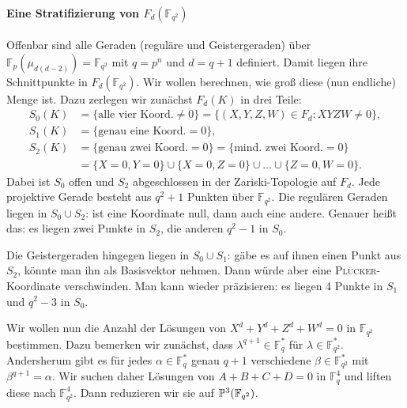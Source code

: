 \paragraph{Eine Stratifizierung von $F_d(\mathbb F_{q^2})$} Offenbar sind alle Geraden (reguläre und Geistergeraden) über $\mathbb F_p(\mu_{d(d-2)}) = \mathbb F_{q^2}$ mit $q = p^n$ und $d = q+1$ definiert. Damit liegen ihre Schnittpunkte in $F_d(\mathbb F_{q^2})$. Wir wollen berechnen, wie groß diese (nun endliche) Menge ist. Dazu zerlegen wir zunächst $F_d(K)$ in drei Teile:
\begin{align*}
S_0(K) &= \{\text{alle vier Koord.}\neq 0\} = \{(X,Y,Z,W) \in F_d : XYZW \neq 0\}, \\
S_1(K) &= \{\text{genau eine Koord.}= 0\}, \\
S_2(K) &= \{\text{genau zwei Koord.}= 0\} = \{\text{mind. zwei Koord.}= 0\} \\
	&= \{X = 0, Y = 0\} \cup \{X = 0, Z = 0\} \cup \dots \cup \{Z = 0, W = 0\}.
\end{align*}
Dabei ist $S_0$ offen und $S_2$ abgeschlossen in der Zariski-Topologie auf $F_d$. Jede projektive Gerade besteht aus $q^2+1$ Punkten über $\mathbb F_{q^2}$. Die regulären Geraden liegen in $S_0 \cup S_2$: ist eine Koordinate null, dann auch eine andere. Genauer heißt das: es liegen zwei Punkte in $S_2$, die anderen $q^2-1$ in $S_0$.

Die Geistergeraden hingegen liegen in $S_0 \cup S_1$: gäbe es auf ihnen einen Punkt aus $S_2$, könnte man ihn als Basisvektor nehmen. Dann würde aber eine \textsc{Plücker}-Koordinate verschwinden. Man kann wieder präzisieren: es liegen 4 Punkte in $S_1$ und $q^2-3$ in $S_0$.

Wir wollen nun die Anzahl der Lösungen von $X^d+Y^d+Z^d+W^d=0$ in $\mathbb F_{q^2}$ bestimmen. Dazu bemerken wir zunächst, dass $\lambda^{q+1} \in \mathbb F_q^*$ für $\lambda \in \mathbb F_{q^2}^*$. Andersherum gibt es für jedes $\alpha \in \mathbb F_q^*$ genau $q+1$ verschiedene $\beta \in \mathbb F_{q^2}^*$ mit $\beta^{q+1} = \alpha$. Wir suchen daher Lösungen von $A+B+C+D=0$ in $\mathbb F_q^4$ und liften diese nach $\mathbb F_{q^2}^4$. Dann reduzieren wir sie auf $\mathbb P^{3}(\mathbb F_{q^2})$.

